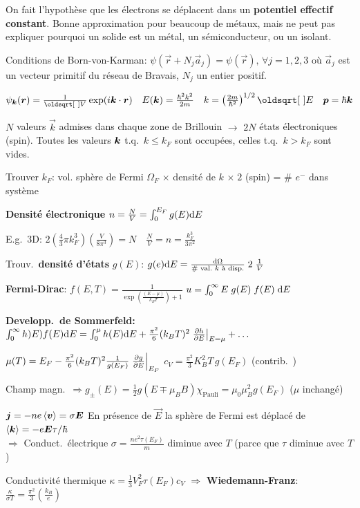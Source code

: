 On fait l’hypothèse que les électrons se déplacent dans un \textbf{potentiel eﬀectif constant}. Bonne approximation pour beaucoup de métaux, mais ne peut pas expliquer pourquoi un solide est un métal, un sémiconducteur, ou un isolant.
\begin{squishlist}
    \item Conditions de Born-von-Karman: $\psi(\vec{r} + N_j \vec{a}_j) = \psi(\vec{r}), \, \forall j=1,2,3$ où $\vec{a}_j$ est un vecteur primitif du réseau de Bravais, $N_j$ un entier positif.
    \item $\psi_{\vk}(\vr) = \frac{1}{\sqrt{V}}\exp(i \vk \cdot \vr) \quad E(\vk) = \frac{\hbar^2 k^2}{2m} \quad k = \left(\frac{2m}{\hbar^2}\right)^{1/2} \sqrt{E} \quad \vec{p}=\hbar \vec{k}$
    \item $N$ valeurs $\vec{k}$ admises dans chaque zone de Brillouin $\rightarrow$ $2N$ états électroniques (spin). Toutes les valeurs $\vk$ t.q.\ $k\leq k_F$ sont occupées, celles t.q.\ $k > k_F$ sont vides.
    \item Trouver $k_F$: vol. sphère de Fermi $\Omega_F$ $\times$ densité de $k$ $\times \; 2$ (spin) = \# $e^-$ dans système 
    \item \textbf{Densité électronique} $n = \frac{N}{V} = \int_0^{E_F} g(E) \ud E$
    \item E.g.\ 3D: $2 \left( \frac{4}{3}\pi k^3_F\right) \left( \frac{V}{8\pi^3}\right) = N \quad \frac{N}{V} = n = \frac{k_F^3}{3\pi^2}$

    \item Trouv.\ \textbf{densité d'états} $g(E)$: $g(e) \ud E = \frac{\ud \Omega}{\text{\# val.\ $k$ à disp.}} \; 2 \; \frac{1}{V}$ 
    \item \textbf{Fermi-Dirac}: $f(E,T) = \frac{1}{\exp\left(\frac{(E- \mu)}{k_B T}\right) + 1}$ \squishsep $u = \int_{0}^{\infty}E \; g(E)\; f(E) \; \ud E$
    \item \textbf{Developp.\ de Sommerfeld:} $\int_{0}^{\infty}h)E) f(E) \ud E = \int_{0}^{\mu} h(E) \ud E + \frac{\pi^2}{6}(k_BT)^2 \left.\D{E}{h}\right|_{E=\mu} + \ldots$
    \item $\mu(T) = E_F - \frac{\pi^2}{6}(k_B T)^2 \frac{1}{g(E_F)} \left.\D{E}{g}\right|_{E_F}$ \squishsep $c_V = \frac{\pi^2}{3}K_B^2 T \, g(E_F) $ (contrib.\ \elec)
    \item Champ magn.\ $\Rightarrow g_{\pm}(E) = \frac{1}{2}g(E\mp \mu_B B)$\quad $\chi_{\text{Pauli}} = \mu_0 \mu_B^2 g(E_F)$ ($\mu$ inchangé)
    \item $\vec{j} = -ne \braket{\vec{v}} = \sigma \vec{E}$ \quad En présence de $\vec{E}$ la sphère de Fermi est déplacé de $\braket{\vk}=-e\vec{E}\tau / \hbar$ \\
    $\Longrightarrow$ Conduct.\ électrique $\sigma = \frac{n e^2 \tau(E_F)}{m}$ diminue avec $T$ (parce que $\tau$ diminue avec $T$)
    \item Conductivité thermique $\kappa = \frac{1}{3}V_F^2 \tau(E_F) c_V$ $\Rightarrow$ \textbf{Wiedemann-Franz}: $\frac{\kappa}{\sigma T} = \frac{\pi^2}{3}\left(\frac{k_B}{e}\right)$
\end{squishlist}

